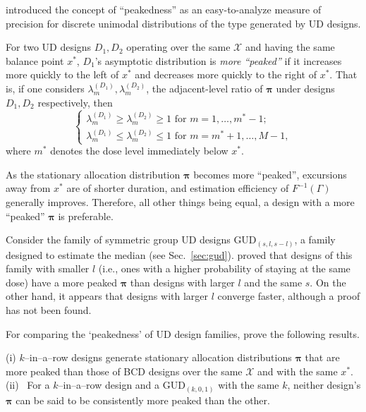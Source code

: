 \cite{Giov:Pint:Pint:prop:1998} introduced the concept of ``peakedness'' as an easy-to-analyze measure of precision for discrete unimodal distributions of the type generated by UD designs.
%
\begin{defn}\label{def:peak}
For two UD designs $D_1,D_2$ operating over the same $\mathcal{X}$ and having the same balance point $x^*$, $D_1$'s asymptotic distribution is \emph{more ``peaked''} if it increases more quickly to the left of $x^*$ and decreases more quickly to the right of $x^*$. That is, if one considers $\lambda^{(D_1)}_m,\lambda^{(D_2)}_m$, the adjacent-level ratio of $\boldsymbol{\pi}$ under designs $D_1,D_2$ respectively, then
\begin{equation}\label{eq:peakdef}
\begin{cases}
\lambda^{(D_1)}_{m}\ge\lambda^{(D_2)}_{m}\ge 1\textrm{ for }m=1,\ldots,m^*-1; \\
\lambda^{(D_1)}_{m}\le\lambda^{(D_2)}_{m} \le 1\textrm{ for }m = m^*+1,\ldots,M-1,
\end{cases}
\end{equation}
where $m^*$ denotes the dose level immediately below $x^*$.
\end{defn}
%
As the stationary allocation distribution $\boldsymbol{\pi}$ becomes more ``peaked'', excursions away from $x^*$ are of shorter duration, and estimation efficiency of $F^{-1}\left(\Gamma\right)$ generally improves. Therefore, all other things being equal, a design with a more ``peaked'' $\boldsymbol{\pi}$ is preferable.

Consider the family of symmetric group UD designs GUD$_{(s,l,s-l)}$, a family designed to estimate the median (see Sec.~\ref{sec:gud}). \cite{Oron07} proved that designs of this family with smaller $l$ (i.e., ones with a higher probability of staying at the same dose) have a more peaked $\boldsymbol{\pi}$ than designs with larger $l$ and the same $s$. On the other hand, it appears that designs with larger $l$ converge faster, although a proof has not been found.

For comparing the `peakedness' of UD design families, \cite{Oron:Hoff:thek:2009} prove the following results.
%
\begin{thm}\label{thm:peak} (i) $k$--in--a--row designs generate stationary allocation distributions $\boldsymbol{\pi}$ that are more peaked than those of BCD designs over the same $\mathcal{X}$ and with the same $x^*$.
%
\noindent (ii) \ For a $k$--in--a--row design and a GUD$_{(k,0,1)}$ with the same $k$, neither design's $\boldsymbol{\pi}$ can be said to be consistently more peaked than the other.
\end{thm}

